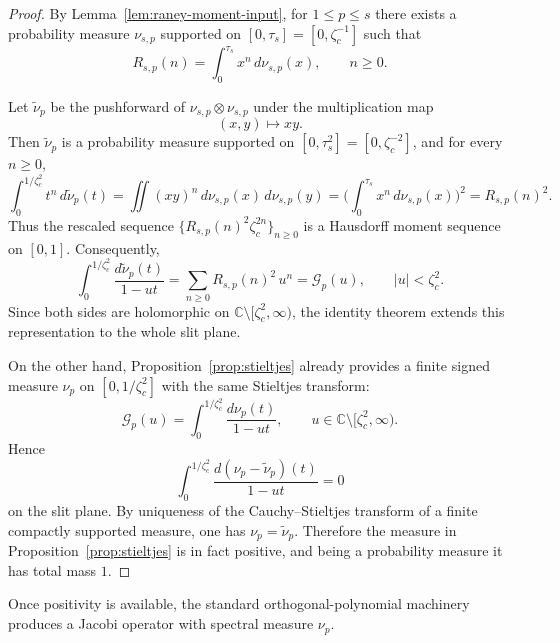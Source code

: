 \documentclass[11pt]{amsart}
\numberwithin{equation}{section}
\theoremstyle{plain}
\theoremstyle{definition}
\theoremstyle{remark}
\newcommand{\CC}{\mathbb{C}}
\begin{document}
\begin{proof}
	By Lemma~\ref{lem:raney-moment-input}, for \(1\le p\le s\) there exists a
	probability measure \(\nu_{s,p}\) supported on
	\([0,\tau_s]=[0,\zeta_c^{-1}]\) such that
	\[
		R_{s,p}(n)=\int_0^{\tau_s}x^n\,d\nu_{s,p}(x),
		\qquad n\ge0.
	\]

	Let \(\widetilde\nu_p\) be the pushforward of
	\(\nu_{s,p}\otimes\nu_{s,p}\) under the multiplication map
	\[
		(x,y)\mapsto xy.
	\]
	Then \(\widetilde\nu_p\) is a probability measure supported on
	\([0,\tau_s^2]=[0,\zeta_c^{-2}]\), and for every \(n\ge0\),
	\[
		\int_0^{1/\zeta_c^2} t^n\,d\widetilde\nu_p(t)
		=
		\iint (xy)^n\,d\nu_{s,p}(x)\,d\nu_{s,p}(y)
		=
		\biggl(\int_0^{\tau_s}x^n\,d\nu_{s,p}(x)\biggr)^2
		=
		R_{s,p}(n)^2.
	\]
	Thus the rescaled sequence
	\(\{R_{s,p}(n)^2\zeta_c^{2n}\}_{n\ge0}\) is a Hausdorff moment sequence on
	\([0,1]\). Consequently,
	\[
		\int_0^{1/\zeta_c^2}\frac{d\widetilde\nu_p(t)}{1-ut}
		=
		\sum_{n\ge0}R_{s,p}(n)^2\,u^n
		=
		\mathcal G_p(u),
		\qquad |u|<\zeta_c^2.
	\]
	Since both sides are holomorphic on
	\(\CC\setminus[\zeta_c^2,\infty)\), the identity theorem extends this
	representation to the whole slit plane.

	On the other hand, Proposition~\ref{prop:stieltjes} already provides a
	finite signed measure \(\nu_p\) on \([0,1/\zeta_c^2]\) with the same
	Stieltjes transform:
	\[
		\mathcal G_p(u)
		=
		\int_0^{1/\zeta_c^2}\frac{d\nu_p(t)}{1-ut},
		\qquad
		u\in\CC\setminus[\zeta_c^2,\infty).
	\]
	Hence
	\[
		\int_0^{1/\zeta_c^2}\frac{d(\nu_p-\widetilde\nu_p)(t)}{1-ut}=0
	\]
	on the slit plane. By uniqueness of the Cauchy--Stieltjes transform of a
	finite compactly supported measure, one has
	\(\nu_p=\widetilde\nu_p\). Therefore the measure in
	Proposition~\ref{prop:stieltjes} is in fact positive, and being a
	probability measure it has total mass \(1\).
\end{proof}

Once positivity is available, the standard orthogonal-polynomial machinery
produces a Jacobi operator with spectral measure \(\nu_p\).
\end{document}
